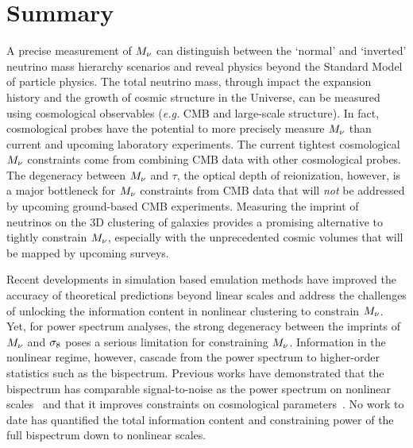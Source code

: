 \section{Summary} 
A precise measurement of $M_\nu$ can distinguish between the `normal' 
and `inverted' neutrino mass hierarchy scenarios and reveal physics 
beyond the Standard Model of particle physics. The total neutrino mass, 
through impact the  expansion history and the growth of cosmic structure 
in the Universe, can be measured using cosmological observables (\emph{e.g.} 
CMB and large-scale structure). In fact, cosmological probes have the 
potential to more precisely measure $M_\nu$ than current and upcoming 
laboratory experiments. The current tightest cosmological $M_\nu$ 
constraints come from combining CMB data with other cosmological probes. 
The degeneracy between $M_\nu$ and $\tau$, the optical depth of reionization, 
however, is a major bottleneck for $M_\nu$ constraints from CMB data 
that will {\em not} be addressed by upcoming ground-based CMB experiments. 
Measuring the imprint of neutrinos on the 3D clustering of galaxies 
provides a promising alternative to tightly constrain $M_\nu$, especially 
with the unprecedented cosmic volumes that will be mapped by upcoming 
surveys. 

Recent developments in simulation based emulation methods have improved 
the accuracy of theoretical predictions beyond linear scales and address 
the challenges of unlocking the information content in nonlinear clustering 
to constrain $M_\nu$. Yet, for power spectrum analyses, the strong 
degeneracy between the imprints of $M_\nu$ and $\sigma_8$ poses a serious 
limitation for constraining $M_\nu$. Information in the nonlinear 
regime, however, cascade from the power spectrum to higher-order statistics 
such as the bispectrum. Previous works have demonstrated that the bispectrum
has comparable signal-to-noise as the power spectrum on nonlinear scales~\citep{sefusatti2005, chan2017}
and that it improves constraints on cosmological parameters~\citep{sefusatti2006, yankelevich2019, chudaykin2019}. 
No work to date has quantified the total information content and constraining 
power of the full bispectrum down to nonlinear scales. 

